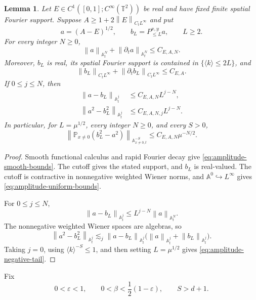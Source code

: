 \documentclass[12pt,reqno,letterpaper]{amsart}
\numberwithin{equation}{section}
\newtheorem{lemma}[theorem]{Lemma}
\theoremstyle{definition}
\newcommand{\T}{\mathbb T}
\newcommand{\A}{\mathbb A}
\newcommand{\eps}{\varepsilon}
\newcommand{\norm}[1]{\left\lVert #1\right\rVert}
\begin{document}
\begin{lemma}\label{lem:amplitude-cutoff}
Let $E\in C^1([0,1];C^\infty(\T^2))$ be real and have fixed finite spatial
Fourier support.  Suppose
$A\geq1+2\norm{E}_{C_tL^\infty}$ and put
\[
   a=(A-E)^{1/2},
   \qquad b_L=P_{\leq L}^{x,y}a,
   \qquad L\geq2.
\]
For every integer $N\geq0$,
\begin{equation}\label{eq:amplitude-smooth-bounds}
   \norm{a}_{\A^N_t}+\norm{\partial_ta}_{\A^N_t}
      \leq C_{E,A,N}.
\end{equation}
Moreover, $b_L$ is real, its spatial Fourier support is contained in
$\{\langle k\rangle\leq2L\}$, and
\begin{equation}\label{eq:amplitude-uniform-bounds}
   \norm{b_L}_{C_tL^\infty}
     +\norm{\partial_tb_L}_{C_tL^\infty}
       \leq C_{E,A}.
\end{equation}
If $0\leq j\leq N$, then
\begin{equation*}
\begin{split}
   \norm{a-b_L}_{\A^j_t}
      &\leq C_{E,A,N}L^{j-N},\\
   \norm{a^2-b_L^2}_{\A^j_t}
      &\leq C_{E,A,N,j}L^{j-N}.
\end{split}
\end{equation*}
In particular, for $L=\mu^{1/2}$, every integer $N\geq0$, and every
$S>0$,
\begin{equation}\label{eq:amplitude-negative-tail}
   \norm{\mathbb P_{x\neq0}(b_L^2-a^2)}
      _{\A^{-S}_{x\neq0,t}}
      \leq C_{E,A,N}\mu^{-N/2}.
\end{equation}
\end{lemma}

\begin{proof}
Smooth functional calculus and rapid Fourier decay give
\eqref{eq:amplitude-smooth-bounds}.  The cutoff gives the stated support,
and $b_L$ is real-valued.  The cutoff is contractive in nonnegative weighted
Wiener norms, and $\A^0\hookrightarrow L^\infty$ gives
\eqref{eq:amplitude-uniform-bounds}.

For $0\leq j\leq N$,
\[
 \norm{a-b_L}_{\A^j_t}
 \leq L^{j-N}\norm{a}_{\A^N_t}.
\]
The nonnegative weighted Wiener spaces are algebras, so
\[
 \norm{a^2-b_L^2}_{\A^j_t}
 \lesssim_j
   \norm{a-b_L}_{\A^j_t}
   \bigl(\norm{a}_{\A^j_t}+\norm{b_L}_{\A^j_t}\bigr).
\]
Taking $j=0$, using
$\langle k\rangle^{-S}\leq1$, and then setting $L=\mu^{1/2}$ gives
\eqref{eq:amplitude-negative-tail}.
\end{proof}

Fix
\begin{equation}\label{eq:onestep-fixed-parameters}
   0<\eps<1,
   \qquad 0<\beta<\frac12(1-\eps),
   \qquad S>d+1.
\end{equation}
\end{document}
